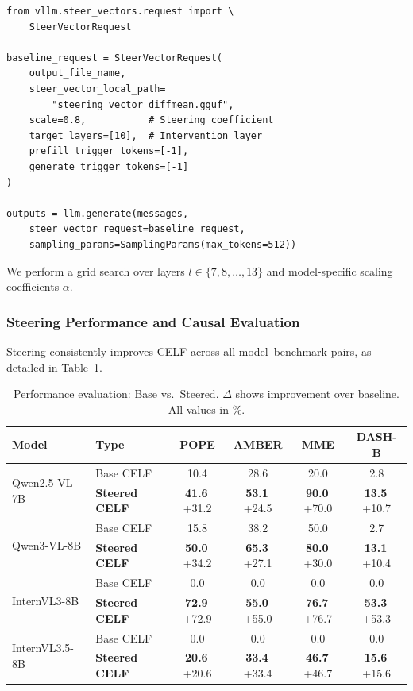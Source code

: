 \documentclass[12pt,a4paper]{article}
\begin{document}
\begin{lstlisting}[caption={Steering injection at inference time (\texttt{inference.ipynb})}]
from vllm.steer_vectors.request import \
    SteerVectorRequest

baseline_request = SteerVectorRequest(
    output_file_name,
    steer_vector_local_path=
        "steering_vector_diffmean.gguf",
    scale=0.8,           # Steering coefficient
    target_layers=[10],  # Intervention layer
    prefill_trigger_tokens=[-1],
    generate_trigger_tokens=[-1]
)

outputs = llm.generate(messages,
    steer_vector_request=baseline_request,
    sampling_params=SamplingParams(max_tokens=512))
\end{lstlisting}

We perform a grid search over layers $l \in \{7, 8, \ldots, 13\}$ and model-specific scaling coefficients $\alpha$.

\subsubsection{Steering Performance and Causal Evaluation}
Steering consistently improves CELF across all model--benchmark pairs, as detailed in Table~\ref{tab:steered}.

\begin{table}[ht]
\centering
\caption{Performance evaluation: Base vs.\ Steered. $\Delta$ shows improvement over baseline. All values in \%.}
\label{tab:steered}
\small
\begin{tabular}{@{}llcccc@{}}
\toprule
\textbf{Model} & \textbf{Type} & \textbf{POPE} & \textbf{AMBER} & \textbf{MME} & \textbf{DASH-B} \\
\midrule
\multirow{2}{*}{Qwen2.5-VL-7B} & Base CELF & 10.4 & 28.6 & 20.0 & 2.8 \\
 & \textbf{Steered CELF} & \textbf{41.6}\,\scriptsize{+31.2} & \textbf{53.1}\,\scriptsize{+24.5} & \textbf{90.0}\,\scriptsize{+70.0} & \textbf{13.5}\,\scriptsize{+10.7} \\
\midrule
\multirow{2}{*}{Qwen3-VL-8B} & Base CELF & 15.8 & 38.2 & 50.0 & 2.7 \\
 & \textbf{Steered CELF} & \textbf{50.0}\,\scriptsize{+34.2} & \textbf{65.3}\,\scriptsize{+27.1} & \textbf{80.0}\,\scriptsize{+30.0} & \textbf{13.1}\,\scriptsize{+10.4} \\
\midrule
\multirow{2}{*}{InternVL3-8B} & Base CELF & 0.0 & 0.0 & 0.0 & 0.0 \\
 & \textbf{Steered CELF} & \textbf{72.9}\,\scriptsize{+72.9} & \textbf{55.0}\,\scriptsize{+55.0} & \textbf{76.7}\,\scriptsize{+76.7} & \textbf{53.3}\,\scriptsize{+53.3} \\
\midrule
\multirow{2}{*}{InternVL3.5-8B} & Base CELF & 0.0 & 0.0 & 0.0 & 0.0 \\
 & \textbf{Steered CELF} & \textbf{20.6}\,\scriptsize{+20.6} & \textbf{33.4}\,\scriptsize{+33.4} & \textbf{46.7}\,\scriptsize{+46.7} & \textbf{15.6}\,\scriptsize{+15.6} \\
\bottomrule
\end{tabular}
\end{table}
\end{document}
